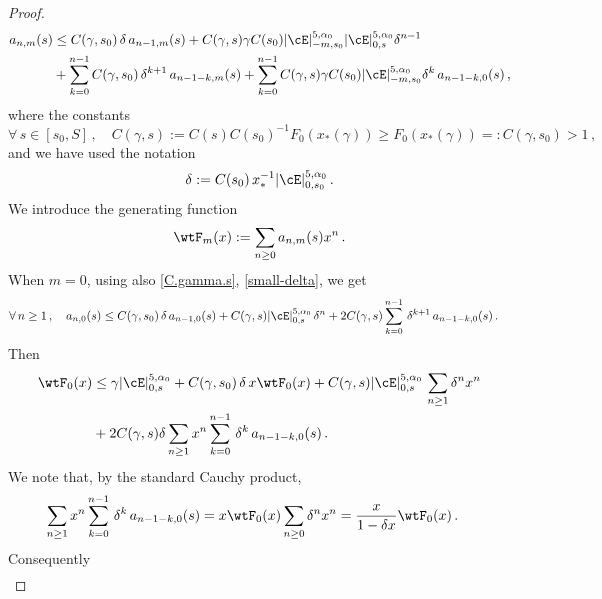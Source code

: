 \documentclass[a4paper,reqno,10pt]{article}
\begin{document}
\begin{proof}
\begin{align}
		 	a_{n,m}(s) & \leq   C(\gamma, s_0)\,  \delta\,  a_{n-1,m}(s) + C(\gamma,s) \gamma C(s_0)  |\cE|_{-m,s_0}^{5,\alpha_{0}}   |\cE|_{0,s}^{5,\alpha_{0}} \delta^{n-1} \\
		 	\nonumber 	&  +  \sum_{k=0}^{n-1}  C(\gamma,s_0)   \,\delta^{k+1} \, a_{n-1-k,m}(s) +\sum_{k=0}^{n-1} C(\gamma,s) \gamma C(s_0)|\cE|_{-m,s_0}^{5,\alpha_{0}} \delta^{k}\,a_{n-1-k,0}(s)  \,,
		 	\end{align}
            where the constants 
            \begin{equation}\label{C.gamma.s}
              \forall\, s \in [s_0,S]\,, \quad   C(\gamma,s):= C(s)C(s_0)^{-1} F_0(x_*(\gamma
            )) \geq F_0(x_*(\gamma)) =: C(\gamma,s_0) >1 \,,
            \end{equation}
            and we have  used the notation 
            \begin{align}\label{small-delta}\delta:={C(s_0)}\,x_*^{-1} |\cE|_{0,s_0}^{5,\alpha_{0}} \,.
            \end{align} We introduce the generating function
		 	\begin{equation}\label{F-gener}
		 		\wtF_m(x) := \sum_{n\geq 0} a_{n,m}(s) x^n \,.
		 	\end{equation}
            When $m=0$, using also \eqref{C.gamma.s}, \eqref{small-delta}, we get
            \begin{align*}
		 	\forall \, n\geq1\,, \quad a_{n,0}(s) & \leq   C(\gamma, s_0)\,  \delta\,  a_{n-1,0}(s) + C(\gamma,s)  |\cE|_{0,s}^{5,\alpha_{0}}\,   \delta^{n}   +  2C(\gamma,s)\sum_{k=0}^{n-1}     \,\delta^{k+1} \, a_{n-1-k,0}(s)\,.
		 	\end{align*}
            Then
            \begin{align*}
		 	\wtF_0(x) & \leq  \gamma |\cE|_{0,s}^{5,\alpha_{0}}+ C(\gamma, s_0)\,  \delta\,  x\wtF_0(x) + C(\gamma,s)  |\cE|_{0,s}^{5,\alpha_{0}}\,   \sum_{n\geq 1}\delta^{n} x^n\\
            &+ 2 C(\gamma,s)\delta \sum_{n\geq1}x^n\sum_{k=0}^{n-1}     \,\delta^{k} \, a_{n-1-k,0}(s)\,.
		 	\end{align*}
            We note that, by the standard Cauchy product,
            \begin{align*}
            \sum_{n\geq1}x^n\sum_{k=0}^{n-1}     \,\delta^{k} \, a_{n-1-k,0}(s)&=x \wtF_0(x)\sum_{n\geq0}
        \delta^n x^n =\frac{x}{1-\delta x} \wtF_0(x)\,.
            \end{align*}
            Consequently
            \begin{align}\label{F1=gen}

\end{align}
\end{proof}
\end{document}

